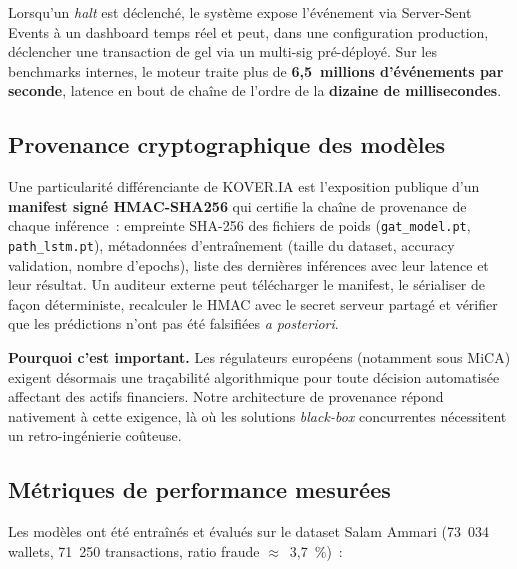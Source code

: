 \documentclass[11pt,a4paper]{article}
\begin{document}
Lorsqu'un \emph{halt} est déclenché, le système expose l'événement via
Server-Sent Events à un dashboard temps réel et peut, dans une
configuration production, déclencher une transaction de gel via un
multi-sig pré-déployé. Sur les benchmarks internes, le moteur traite
plus de \textbf{6,5~millions d'événements par seconde}, latence en bout
de chaîne de l'ordre de la \textbf{dizaine de millisecondes}.

\subsection{Provenance cryptographique des modèles}

Une particularité différenciante de \textsc{KOVER.IA} est l'exposition
publique d'un \textbf{manifest signé HMAC-SHA256} qui certifie la
chaîne de provenance de chaque inférence~: empreinte SHA-256 des
fichiers de poids (\texttt{gat\_model.pt}, \texttt{path\_lstm.pt}),
métadonnées d'entraînement (taille du dataset, accuracy validation,
nombre d'epochs), liste des dernières inférences avec leur latence et
leur résultat. Un auditeur externe peut télécharger le manifest, le
sérialiser de façon déterministe, recalculer le HMAC avec le secret
serveur partagé et vérifier que les prédictions n'ont pas été
falsifiées \emph{a posteriori}.

\begin{insight}
\textbf{Pourquoi c'est important.} Les régulateurs européens (notamment
sous MiCA) exigent désormais une traçabilité algorithmique pour toute
décision automatisée affectant des actifs financiers. Notre architecture
de provenance répond nativement à cette exigence, là où les solutions
\emph{black-box} concurrentes nécessitent un retro-ingénierie coûteuse.
\end{insight}

\subsection{Métriques de performance mesurées}

Les modèles ont été entraînés et évalués sur le dataset Salam Ammari
(73~034 wallets, 71~250 transactions, ratio fraude $\approx$~3,7~\%)~:
\end{document}
